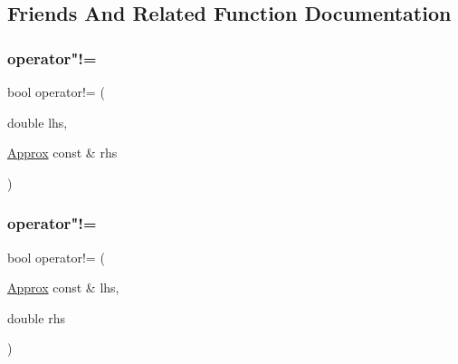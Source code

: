 \subsection{Friends And Related Function Documentation}
\hypertarget{class_catch_1_1_detail_1_1_approx_a83b3763569a7ecc143c335b630be0e47}{}\label{class_catch_1_1_detail_1_1_approx_a83b3763569a7ecc143c335b630be0e47} 
\subsubsection{\texorpdfstring{operator"!=}{operator!=}\hspace{0.1cm}{\footnotesize\ttfamily [1/2]}}
{\footnotesize\ttfamily bool operator!= (\begin{DoxyParamCaption}\item[{double}]{lhs,  }\item[{\hyperlink{class_catch_1_1_detail_1_1_approx}{Approx} const \&}]{rhs }\end{DoxyParamCaption})\hspace{0.3cm}{\ttfamily [friend]}}

\hypertarget{class_catch_1_1_detail_1_1_approx_a7497ef839f8026cc0edd6269a80f3e09}{}\label{class_catch_1_1_detail_1_1_approx_a7497ef839f8026cc0edd6269a80f3e09} 
\subsubsection{\texorpdfstring{operator"!=}{operator!=}\hspace{0.1cm}{\footnotesize\ttfamily [2/2]}}
{\footnotesize\ttfamily bool operator!= (\begin{DoxyParamCaption}\item[{\hyperlink{class_catch_1_1_detail_1_1_approx}{Approx} const \&}]{lhs,  }\item[{double}]{rhs }\end{DoxyParamCaption})\hspace{0.3cm}{\ttfamily [friend]}}

\hypertarget{class_catch_1_1_detail_1_1_approx_ac766f044f1c63f0c5997982baefd9049}{}\label{class_catch_1_1_detail_1_1_approx_ac766f044f1c63f0c5997982baefd9049} 
